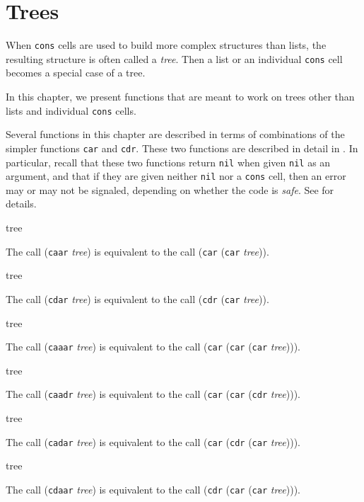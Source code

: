 \chapter{Trees}
\label{chap-trees}

When \texttt{cons} cells are used to build more complex structures
than lists, the resulting structure is often called a \emph{tree}.
Then a list or an individual \texttt{cons} cell becomes a special case
of a tree.

In this chapter, we present functions that are meant to work on trees
other than lists and individual \texttt{cons} cells.

Several functions in this chapter are described in terms of
combinations of the simpler functions \texttt{car} and \texttt{cdr}.
These two functions are described in detail in
.  In particular, recall that these
two functions return \texttt{nil} when given \texttt{nil} as an
argument, and that if they are given neither \texttt{nil} nor a
\texttt{cons} cell, then an error may or may not be signaled,
depending on whether the code is \emph{safe}.  See
 for details.

 {tree}

The call (\texttt{caar} \textit{tree}) is equivalent to the call
(\texttt{car} (\texttt{car} \textit{tree})).

 {tree}

The call (\texttt{cdar} \textit{tree}) is equivalent to the call
(\texttt{cdr} (\texttt{car} \textit{tree})).

 {tree}

The call (\texttt{caaar} \textit{tree}) is equivalent to the call
(\texttt{car} (\texttt{car} (\texttt{car} \textit{tree}))).

 {tree}

The call (\texttt{caadr} \textit{tree}) is equivalent to the call
(\texttt{car} (\texttt{car} (\texttt{cdr} \textit{tree}))).

 {tree}

The call (\texttt{cadar} \textit{tree}) is equivalent to the call
(\texttt{car} (\texttt{cdr} (\texttt{car} \textit{tree}))).

 {tree}

The call (\texttt{cdaar} \textit{tree}) is equivalent to the call
(\texttt{cdr} (\texttt{car} (\texttt{car} \textit{tree}))).
